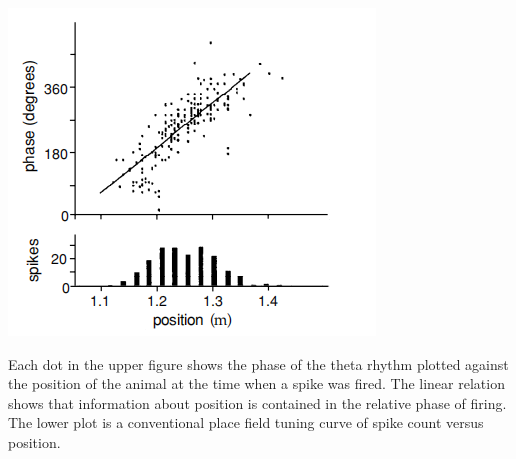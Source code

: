 \begin{center}
    \label{fig:1.18}
    \includegraphics[scale = 0.5]{./png/Figure1-18}\\
\end{center}
Each dot in the upper figure shows the phase of the theta rhythm plotted against the position of the animal at the time when a spike was fired. The linear relation shows that information about position is contained in the relative phase of firing. The lower plot is a conventional place field tuning curve of spike count versus position.

